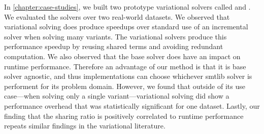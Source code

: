 In \autoref{chapter:case-studies}, we built two prototype variational solvers
called \vsat{} and \vsmt{}. We evaluated the solvers over two real-world
datasets. We observed that variational solving does produce speedups over
standard use of an incremental solver when solving many variants. The
variational solvers produce this performance speedup by reusing shared terms and
avoiding redundant computation. We also observed that the base solver does have
an impact on runtime performance. Therefore an advantage of our method is that
it is base solver agnostic, and thus implementations can choose whichever
\acl{smtlib} solver is performent for its problem domain. However, we found that
outside of its use case---when solving only a single variant---variational
solving did show a performance overhead that was statistically significant for
one dataset. Lastly, our finding that the sharing ratio is positively correlated
to runtime performance repeats similar findings in the variational literature.
